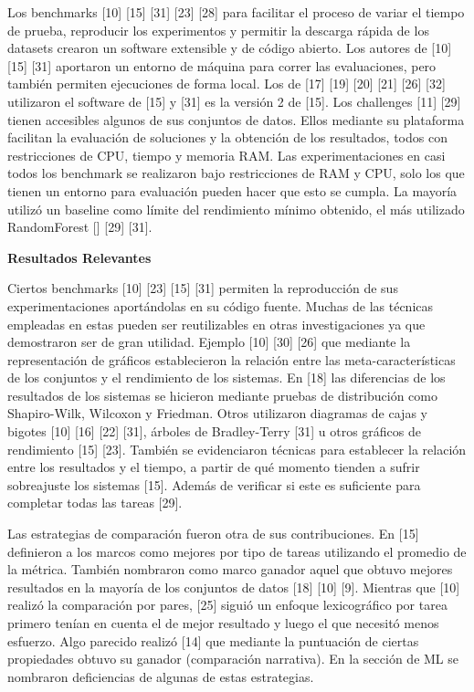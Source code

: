 Los benchmarks [10] [15] [31] [23] [28] para facilitar el proceso de variar el tiempo de prueba, reproducir los experimentos y permitir la descarga rápida de los datasets crearon un 
software extensible y de código abierto. Los autores de [10] [15] [31] aportaron un entorno de máquina para correr las evaluaciones, pero también permiten ejecuciones de forma local. 
Los de [17] [19] [20] [21] [26] [32] utilizaron el software de [15] y [31] es la versión 2 de [15]. Los challenges [11] [29] tienen accesibles algunos de sus conjuntos de datos. 
Ellos mediante su plataforma facilitan la evaluación de soluciones y la obtención de los resultados, todos con restricciones de CPU, tiempo y memoria RAM. Las 
experimentaciones en casi todos los benchmark se realizaron bajo restricciones de RAM y CPU, solo los que tienen un entorno para evaluación pueden hacer que esto se 
cumpla. La mayoría utilizó un baseline como límite del rendimiento mínimo obtenido, el más utilizado RandomForest [] [29] [31].

\begin{flushleft} 
    {\large { \textbf{Resultados Relevantes}}}\label{subsection:result_AutoML}
\end{flushleft}

Ciertos benchmarks [10] [23] [15] [31] permiten la reproducción de sus experimentaciones aportándolas en su código fuente. Muchas de las técnicas empleadas en estas pueden ser 
reutilizables en otras investigaciones ya que demostraron ser de gran utilidad. Ejemplo [10] [30] [26] que mediante la representación de gráficos establecieron la 
relación entre las meta-características de los conjuntos y el rendimiento de los sistemas. En [18] las diferencias de los resultados de los sistemas se hicieron mediante 
pruebas de distribución como Shapiro-Wilk, Wilcoxon y Friedman. Otros utilizaron diagramas de cajas y bigotes [10] [16] [22] [31], árboles de Bradley-Terry [31] u otros 
gráficos de rendimiento [15] [23]. También se evidenciaron técnicas para establecer la relación entre los resultados y el tiempo, a partir de qué momento tienden a sufrir sobreajuste los 
sistemas [15]. Además de verificar si este es suficiente para completar todas las tareas [29].

Las estrategias de comparación fueron otra de sus contribuciones. En [15] definieron a los marcos como mejores por tipo de tareas utilizando el promedio de la métrica. También 
nombraron como marco ganador aquel que obtuvo mejores resultados en la mayoría de los conjuntos de datos [18] [10] [9]. Mientras que [10] realizó la comparación por pares,  
[25] siguió un enfoque lexicográfico por tarea primero tenían en cuenta el de mejor resultado y luego el que necesitó menos esfuerzo. Algo parecido realizó [14] que 
mediante la puntuación de ciertas propiedades obtuvo su ganador (comparación narrativa). En la sección de ML se nombraron deficiencias de algunas de estas estrategias.

